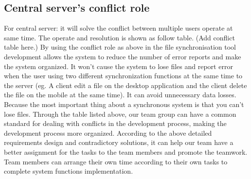 \subsection{Central server’s conflict role}
For central server: it will solve the conflict between multiple users operate at same time. The operate and resolution is shown as follow table.\newline
(Add conflict table here.)\newline
By using the conflict role as above in the file synchronisation tool development allows the system to reduce the number of error reports and make the system organized. It won't cause the system to lose files and report error when the user using two different synchronization functions at the same time to the server (eg. A client edit a file on the desktop application and the client delete the file on the mobile at the same time). It can avoid unnecessary data losses. Because the most important thing about a synchronous system is that you can't lose files. Through the table listed above, our team group can have a common standard for dealing with conflicts in the development process, making the development process more organized.\newline
According to the above detailed requirements design and contradictory solutions, it can help our team have a better assignment for the tasks to the team members and promote the teamwork. Team members can arrange their own time according to their own tasks to complete system functions implementation.\newline

